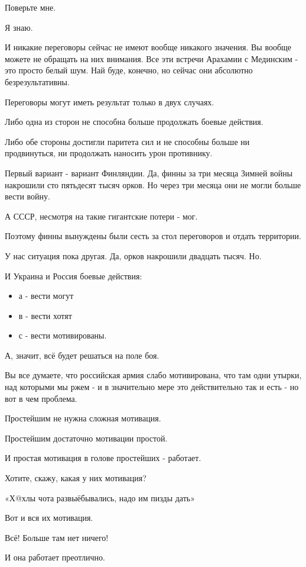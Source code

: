 Поверьте мне. 

Я знаю.

И никакие переговоры сейчас не имеют вообще никакого значения. Вы вообще можете
не обращать на них внимания. Все эти встречи Арахамии с Мединским - это просто
белый шум. Най буде, конечно, но сейчас они абсолютно безрезультативны. 

Переговоры могут иметь результат только в двух случаях. 

Либо одна из сторон не способна больше продолжать боевые действия. 

Либо обе стороны достигли паритета сил и не способны больше ни продвинуться, ни
продолжать наносить урон противнику. 

Первый вариант - вариант Финляндии. Да, финны за три месяца Зимней войны
накрошили сто пятьдесят тысяч орков. Но через три месяца они не могли больше
вести войну. 

А СССР, несмотря на такие гигантские потери - мог. 

Поэтому финны вынуждены были сесть за стол переговоров и отдать территории. 

У нас ситуация пока другая. Да, орков накрошили двадцать тысяч. Но.

И Украина и Россия боевые действия: 

\begin{itemize}
  \item а - вести могут
  \item в - вести хотят
  \item с - вести мотивированы.
\end{itemize}

А, значит, всё будет решаться на поле боя. 

Вы все думаете, что российская армия слабо мотивирована, что там одни утырки,
над которыми мы ржем - и в значительно мере это действительно так и есть - но
вот в чем проблема. 

Простейшим не нужна сложная мотивация. 

Простейшим достаточно мотивации простой. 

И простая мотивация в голове простейших - работает. 

Хотите, скажу, какая у них мотивация? 

«Х@хлы чота развыёбывались, надо им пизды дать»

Вот и вся их мотивация. 

Всё! Больше там нет ничего! 

И она работает преотлично.

